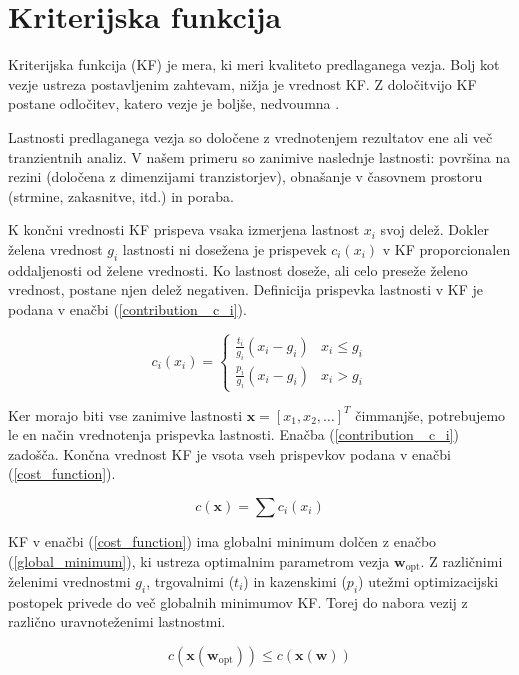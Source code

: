 \documentclass[journal,a4paper,twoside]{sty/IEEEtran}
\begin{document}
\section{Kriterijska funkcija}
Kriterijska funkcija (KF) je mera, ki meri kvaliteto predlaganega vezja. Bolj kot vezje ustreza postavljenim zahtevam, nižja je vrednost KF. Z določitvijo KF postane odločitev, katero vezje je boljše, nedvoumna \cite{burmen1}.

Lastnosti predlaganega vezja so določene z vrednotenjem rezultatov ene ali več tranzientnih analiz. V našem primeru so zanimive naslednje lastnosti: površina na rezini (določena z dimenzijami tranzistorjev), obnašanje v časovnem prostoru (strmine, zakasnitve, itd.) in poraba.

K končni vrednosti KF prispeva vsaka izmerjena lastnost $x_i$ svoj delež. Dokler želena vrednost $g_i$ lastnosti ni dosežena je prispevek $c_i(x_i)$ v KF proporcionalen oddaljenosti od želene vrednosti. Ko lastnost doseže, ali celo preseže želeno vrednost, postane njen delež negativen. Definicija prispevka lastnosti v KF je podana v enačbi (\ref{contribution _c_i}).

\begin{equation}
	\label{contribution _c_i}
	c_i(x_i) =
	\left\{
		\begin{array}{ll}
			\frac{t_i}{g_i} (x_i - g_i) & x_i \le g_i \\
			\frac{p_i}{g_i} (x_i - g_i) & x_i > g_i
		\end{array}
	\right.
\end{equation}

Ker morajo biti vse zanimive lastnosti $\mathbf{x} = [x_1, x_2, \ldots]^T$ čimmanjše, potrebujemo le en način vrednotenja prispevka lastnosti. Enačba (\ref{contribution _c_i}) zadošča. Končna vrednost KF je vsota vseh prispevkov podana v enačbi (\ref{cost_function}).

\begin{equation}
	\label{cost_function}
	c(\mathbf{x}) = \sum c_i(x_i)
\end{equation}

KF v enačbi (\ref{cost_function}) ima globalni minimum dolčen z enačbo (\ref{global_minimum}), ki ustreza optimalnim parametrom vezja $\mathbf{w}_\mathrm{opt}$. Z različnimi želenimi vrednostmi $g_i$, trgovalnimi ($t_i$) in kazenskimi ($p_i$) utežmi optimizacijski postopek privede do več globalnih minimumov KF. Torej do nabora vezij z različno uravnoteženimi lastnostmi.

\begin{equation}
	\label{global_minimum}
	c(\mathbf{x}(\mathbf{w}_\mathrm{opt})) \le c(\mathbf{x}(\mathbf{w}))
\end{equation}
\end{document}
